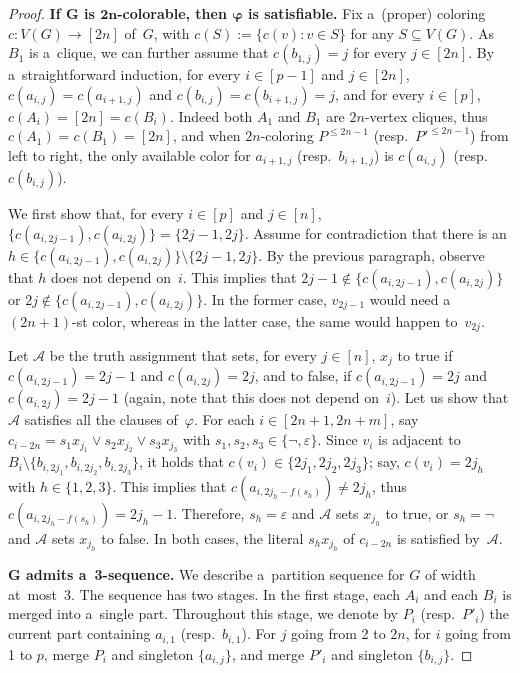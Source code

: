 \documentclass[a4paper,USenglish,cleveref,hyperref,autoref]{lipics-v2021}
\begin{document}
\begin{proof}
  \medskip

  \textbf{If $\bm{G}$ is $\bm{2n}$-colorable, then $\bm{\varphi}$ is satisfiable.}
  Fix a~(proper) coloring $c \colon V(G) \to [2n]$ of~$G$, with $c(S) := \{c(v):v \in S\}$ for any $S \subseteq V(G)$.
  As $B_1$ is a~clique, we can further assume that $c(b_{1,j})=j$ for every $j \in [2n]$. 
  By a~straightforward induction, for every $i \in [p-1]$ and $j \in [2n]$, $c(a_{i,j})=c(a_{i+1,j})$ and $c(b_{i,j})=c(b_{i+1,j})=j$, and for every $i \in [p]$, $c(A_i)=[2n]=c(B_i)$.
  Indeed both $A_1$ and $B_1$ are $2n$-vertex cliques, thus $c(A_1)=c(B_1)=[2n]$, and when $2n$-coloring $P^{\leqslant 2n-1}$ (resp.~$P'^{\leqslant 2n-1}$) from left to right, the only available color for $a_{i+1,j}$ (resp.~$b_{i+1,j}$) is $c(a_{i,j})$ (resp.~$c(b_{i,j})$).

  We first show that, for every $i \in [p]$ and $j \in [n]$, $\{c(a_{i,2j-1}),c(a_{i,2j})\}=\{2j-1,2j\}$.
  Assume for contradiction that there is an $h \in \{c(a_{i,2j-1}),c(a_{i,2j})\} \setminus \{2j-1,2j\}$.
  By the previous paragraph, observe that $h$ does not depend on~$i$.
  This implies that $2j-1 \notin \{c(a_{i,2j-1}),c(a_{i,2j})\}$ or $2j \notin \{c(a_{i,2j-1}),c(a_{i,2j})\}$.
  In the former case, $v_{2j-1}$ would need a~$(2n+1)$-st color, whereas in the latter case, the same would happen to~$v_{2j}$.

  Let $\mathcal A$ be the truth assignment that sets, for every $j \in [n]$, $x_j$ to true if $c(a_{i,2j-1})=2j-1$ and $c(a_{i,2j})=2j$, and to false, if $c(a_{i,2j-1})=2j$ and $c(a_{i,2j})=2j-1$ (again, note that this does not depend on~$i$).
  Let us show that $\mathcal A$ satisfies all the clauses of~$\varphi$.
  For each $i \in [2n+1,2n+m]$, say $c_{i-2n} = s_1 x_{j_1} \lor s_2 x_{j_2} \lor s_3 x_{j_3}$ with $s_1, s_2, s_3 \in \{\neg,\varepsilon\}$.
  Since $v_i$ is adjacent to $B_i \setminus \{b_{i,2j_1}, b_{i,2j_2}, b_{i,2j_3}\}$, it holds that $c(v_i) \in \{2j_1, 2j_2, 2j_3\}$; say, $c(v_i) = 2j_h$ with $h \in \{1,2,3\}$.
  This implies that $c(a_{i,2j_h-f(s_h)}) \neq 2j_h$, thus $c(a_{i,2j_h-f(s_h)}) = 2j_h-1$.
  Therefore, $s_h=\varepsilon$ and $\mathcal A$ sets $x_{j_h}$ to true, or $s_h=\neg$ and $\mathcal A$ sets $x_{j_h}$ to false.
  In both cases, the literal $s_h x_{j_h}$ of $c_{i-2n}$ is satisfied by~$\mathcal A$.

  \medskip

  \textbf{$\bm{G}$ admits a~3-sequence.}
  We describe a~partition sequence for $G$ of width at~most~3.
  The sequence has two stages.
  In the first stage, each $A_i$ and each $B_i$ is merged into a~single part.
  Throughout this stage, we denote by $P_i$ (resp.~$P'_i$) the current part containing $a_{i,1}$ (resp.~$b_{i,1}$).
  For $j$ going from 2 to $2n$, for $i$ going from 1 to $p$, merge $P_i$ and singleton $\{a_{i,j}\}$, and merge $P'_i$ and singleton $\{b_{i,j}\}$.


\end{proof}
\end{document}
